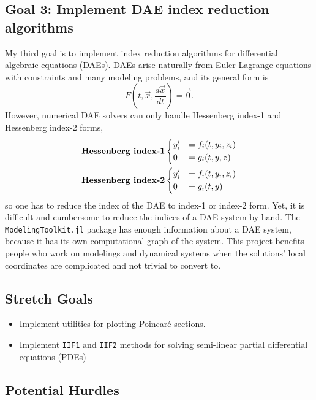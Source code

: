 \documentclass[12pt,a4paper]{article}
\begin{document}
\subsection{Goal 3: Implement DAE index reduction algorithms}
My third goal is to implement index reduction algorithms for differential
algebraic equations (DAEs). DAEs arise naturally from Euler-Lagrange
equations with constraints and many modeling problems, and its general form is
\begin{equation}
  F(t, \vec{x}, \frac{d\vec{x}}{dt}) = \vec{0}.
\end{equation}
However, numerical DAE solvers can only handle Hessenberg index-1 and
Hessenberg index-2 forms,
\begin{align}
  &\textbf{Hessenberg index-1}
  \begin{dcases}
    y_i' &= f_i(t,y_i,z_i)\\
    0 &= g_i(t,y,z)
  \end{dcases}\\
  &\textbf{Hessenberg index-2}
  \begin{dcases}
    y'_i &= f_i(t,y_i,z_i)\\
    0 &= g_i(t,y)
  \end{dcases}
\end{align}
so one has to reduce the index of the DAE to index-1 or index-2 form. Yet, it
is difficult and cumbersome to reduce the indices of a DAE system by hand. The
\texttt{ModelingToolkit.jl} package has enough information about a DAE system,
because it has its own computational graph of the system. This project benefits
people who work on modelings and dynamical systems when the solutions' local
coordinates are complicated and not trivial to convert to.

\subsection{Stretch Goals}
\begin{itemize}
  \item Implement utilities for plotting Poincar\'e sections.
  \item Implement \texttt{IIF1} and \texttt{IIF2} methods for solving
    semi-linear partial differential equations (PDEs)
\end{itemize}

\subsection{Potential Hurdles}
\end{document}
